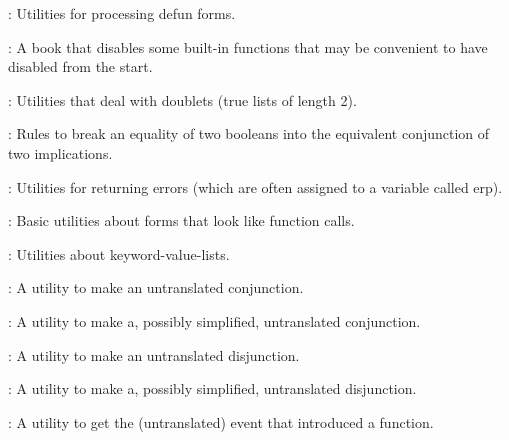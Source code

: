 
\begin{frame}

\newlibtitle

:
Utilities for processing defun forms.

\separation

:
A book that disables some built-in functions that may be convenient to have disabled from the start.

\separation

:
Utilities that deal with doublets (true lists of length 2).

\separation

:
Rules to break an equality of two booleans into the equivalent conjunction of two implications.

\separation

:
Utilities for returning errors (which are often assigned to a variable called erp).

\separation

:
Basic utilities about forms that look like function calls.

\end{frame}


\begin{frame}

\newlibtitle

:
Utilities about keyword-value-lists.

\separation

:
A utility to make an untranslated conjunction.

\separation

:
A utility to make a, possibly simplified, untranslated conjunction.

\separation

:
A utility to make an untranslated disjunction.

\separation

:
A utility to make a, possibly simplified, untranslated disjunction.

\separation

:
A utility to get the (untranslated) event that introduced a function.

\end{frame}

